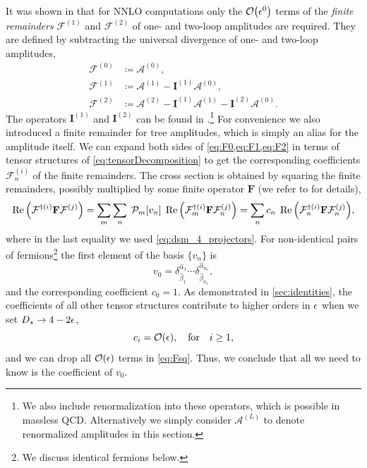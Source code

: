 It was shown in \cite{Weinzierl:2011uz} that for NNLO computations only the $\order{\eps^0}$ terms of the 
\emph{finite remainders} $\mathcal{F}^{(1)}$ and $\mathcal{F}^{(2)}$ of one- and two-loop amplitudes are required.
They are defined by subtracting the universal divergence of one- and two-loop amplitudes, 
\begin{subequations}
  \begin{align}
    \label{eq:F0}
    \mathcal{F}^{(0)} &\coloneqq \mathcal{A}^{(0)}, \\ 
     \label{eq:F1}
    \mathcal{F}^{(1)} &\coloneqq \mathcal{A}^{(1)} - \mathbf{I}^{(1)} \mathcal{A}^{(0)}, \\ 
     \label{eq:F2}
    \mathcal{F}^{(2)} &\coloneqq \mathcal{A}^{(2)}  - \mathbf{I}^{(1)} \mathcal{A}^{(1)} - \mathbf{I}^{(2)} \mathcal{A}^{(0)}.
  \end{align}
\end{subequations}
The operators $\mathbf{I}^{(1)}$ and $\mathbf{I}^{(2)}$ can be found in \cite{Catani:1998bh,Sterman:2002qn,Becher:2009cu,Gardi:2009qi}.\footnote{
  We also include renormalization into these operators, which is possible in massless QCD.
  Alternatively we simply consider $\mathcal{A}^{(L)}$ to denote renormalized amplitudes in this section.
}
For convenience we also introduced a finite remainder for tree amplitudes, which is simply an alias for the amplitude itself.
We can expand both sides of \cref{eq:F0,eq:F1,eq:F2} in terms of tensor structures of \cref{eq:tensorDecomposition}
to get the corresponding coefficients $\mathcal{F}^{(i)}_n$ of the finite remainders.
The cross section is obtained by squaring the finite remainders, possibly multiplied by some
finite operator $\mathbf{F}$ (we refer to \cite{Weinzierl:2011uz} for details),
\begin{equation} \label{eq:Fsq}
  \Re\qty(\mathcal{F}^{\dagger(i)}\mathbf{F}\mathcal{F}^{(j)}) = \sum_m\sum_n\; \mathcal{P}_m \qty[v_n]  \; \Re\qty(\mathcal{F}^{\dagger(i)}_m\mathbf{F}\mathcal{F}^{(j)}_n) = 
     \sum_n c_n \; \Re\qty(\mathcal{F}^{\dagger(i)}_n\mathbf{F}\mathcal{F}^{(j)}_n),
\end{equation}
where in the last equality we used \cref{eq:dsm_4_projectors}.
For non-identical pairs of fermions\footnote{We discuss identical fermions below.} 
the first element of the basis $\{v_n\}$ is
\begin{equation}
  v_0  = \delta^{\hat{\alpha}_1}_{\hat{\beta}_1}\cdots \delta^{\hat{\alpha}_{n_s}}_{\hat{\beta}_{n_s}},
\end{equation}
and the corresponding coefficient $c_0 = 1$.
As demonstrated in \cref{sec:identities}, the coefficients of all other tensor structures
contribute to higher orders in $\epsilon$ when we set $D_s\to 4-2\epsilon$,
\begin{equation}
  c_i=\order{\eps}, \qfor i\geq 1,
\end{equation}
and we can drop all $\order{\eps}$ terms in \cref{eq:Fsq}.
Thus, we conclude that all we need to know is the coefficient of $v_0$.


